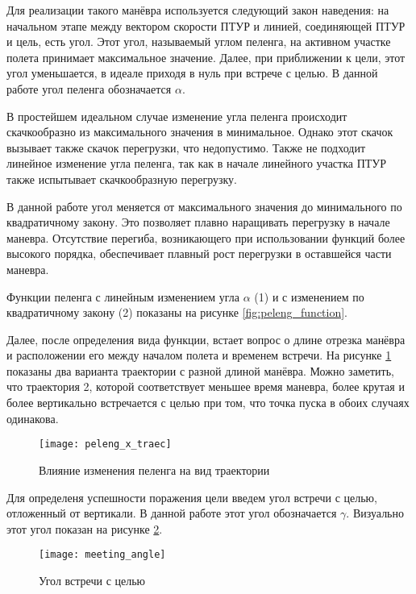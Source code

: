 Для реализации такого манёвра используется следующий закон наведения: на начальном этапе между вектором скорости ПТУР и линией, соединяющей ПТУР и цель, есть угол. Этот угол, называемый углом пеленга, на активном участке полета принимает максимальное значение. Далее, при приближении к цели, этот угол уменьшается, в идеале приходя в нуль при встрече с целью. В данной работе угол пеленга обозначается $\alpha$.

В простейшем идеальном случае изменение угла пеленга происходит скачкообразно из максимального значения в минимальное. Однако этот скачок вызывает также скачок перегрузки, что недопустимо. Также не подходит линейное изменение угла пеленга, так как в начале линейного участка ПТУР также испытывает скачкообразную перегрузку.

В данной работе угол меняется от максимального значения до минимального по квадратичному закону. Это позволяет плавно наращивать перегрузку в начале маневра. Отсутствие перегиба, возникающего при использовании функций более высокого порядка, обеспечивает плавный рост перегрузки в оставшейся части маневра.

Функции пеленга с линейным изменением угла $\alpha$ (1) и с изменением по квадратичному закону (2) показаны на рисунке \ref{fig:peleng_function}.

Далее, после определения вида функции, встает вопрос о длине отрезка манёвра и расположении его между началом полета и временем встречи. На рисунке \ref{fig:peleng_x_traec} показаны два варианта траектории с разной длиной манёвра. Можно заметить, что траектория 2, которой соответствует меньшее время маневра, более крутая и более вертикально встречается с целью при том, что точка пуска в обоих случаях одинакова.

\begin{figure}[!h]
\begin{center}
	\texttt{[image: peleng\_x\_traec]}
	\caption{Влияние изменения пеленга на вид траектории}
	\label{fig:peleng_x_traec}
\end{center}
\end{figure}Для определеня успешности поражения цели введем угол встречи с целью, отложенный от вертикали. В данной работе этот угол обозначается $\gamma$. Визуально этот угол показан на рисунке \ref{fig:meeting_angle}.

\begin{figure}[!h]
\begin{center}
	\texttt{[image: meeting\_angle]}
	\caption{Угол встречи с целью}
	\label{fig:meeting_angle}
\end{center}
\end{figure}


